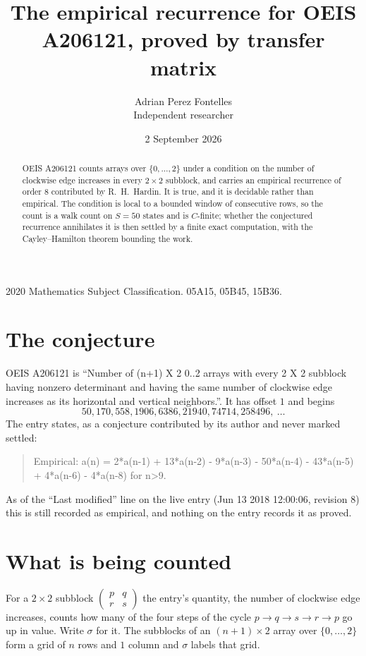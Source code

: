 \documentclass[11pt,a4paper]{article}
\title{The empirical recurrence for OEIS A206121, proved by transfer matrix}
\author{Adrian Perez Fontelles\\ \small Independent researcher}
\date{2 September 2026}
\theoremstyle{plain}
\theoremstyle{definition}
\begin{document}
\maketitle

\begin{abstract}
OEIS A206121 counts arrays over $\{0,\dots,2\}$ under a condition on the number of clockwise edge increases
in every $2\times2$ subblock, and carries an empirical recurrence of order $8$ contributed by
R.~H.~Hardin. It is true, and it is decidable rather than empirical. The condition is local to
a bounded window of consecutive rows, so the count is a walk count on $S=50$ states and is
$C$-finite; whether the conjectured recurrence annihilates it is then settled by a finite exact
computation, with the Cayley--Hamilton theorem bounding the work.
\end{abstract}

\noindent\small 2020 Mathematics Subject Classification. 05A15, 05B45, 15B36.\normalsize

\section{The conjecture}

OEIS A206121 is ``Number of (n+1) X 2 0..2 arrays with every 2 X 2 subblock having nonzero determinant and having the same number of clockwise edge increases as its horizontal and vertical neighbors.''. It has offset $1$ and begins
\[
50, 170, 558, 1906, 6386, 21940, 74714, 258496,\ \dots
\]
The entry states, as a conjecture contributed by its author and never marked settled:
\begin{quote}
Empirical: a(n) = 2*a(n-1) + 13*a(n-2) - 9*a(n-3) - 50*a(n-4) - 43*a(n-5) + 4*a(n-6) - 4*a(n-8) for n>9.
\end{quote}
As of the ``Last modified'' line on the live entry (Jun 13 2018 12:00:06, revision 8) this is still
recorded as empirical, and nothing on the entry records it as proved.

\section{What is being counted}

For a $2\times2$ subblock $\begin{pmatrix}p&q\\r&s\end{pmatrix}$ the
entry's quantity, the number of clockwise edge increases, counts how many of the four steps of the cycle $p\to q\to s\to r\to p$ go up in value. Write $\sigma$ for it. The subblocks of an
$(n+1)\times2$ array over $\{0,\dots,2\}$ form a grid of $n$ rows and $1$
column and $\sigma$ labels that grid.
\end{document}
